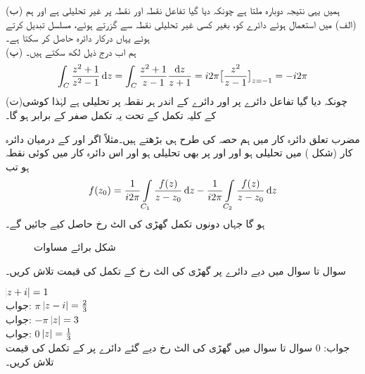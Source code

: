 (ب) \quad ہمیں یہی نتیجہ دوبارہ ملتا ہے چونکہ دیا گیا تفاعل نقطہ  اور نقطہ  پر غیر تحلیلی ہے اور ہم (الف) میں استعمال ہوئے دائرے کو، بغیر کسی غیر تحلیلی نقطہ سے گزرتے ہوئے، مسلسل تبدیل کرتے ہوئے یہاں درکار دائرہ حاصل کر سکتا ہے۔\\
(پ) \quad ہم اب درج ذیل لکھ سکتے ہیں۔
\begin{align*}
\int_C \frac{z^2+1}{z^2-1}\dif z=\int_C \frac{z^2+1}{z-1}\frac{\dif z}{z+1}=i2\pi\big[\frac{z^2}{z-1}\big]_{z=-1}=-i2\pi
\end{align*}
(ت)\quad چونکہ دیا گیا تفاعل دائرے پر اور دائرے کے اندر ہر نقطہ پر تحلیلی ہے لہٰذا کوشی کے کلیہ تکمل کے تحت یہ تکمل صفر کے برابر ہو گا۔ 


مضرب تعلق دائرہ کار میں ہم حصہ  کی طرح ہی بڑھتے ہیں۔مثلاً اگر  اور   کے درمیان دائرہ کار (شکل ) میں  تحلیلی ہو اور  اور  پر بھی  تحلیلی ہو اور اس دائرہ کار میں  کوئی نقطہ ہو تب
\begin{align}\label{مساوات_مخلوط_تکمل_کوشی_کلیہ_تکمل_پ}
f(z_0)=\frac{1}{i2\pi}\int\limits_{C_1}\frac{f(z)}{z-z_0}\dif z-\frac{1}{i2\pi}\int\limits_{C_2} \frac{f(z)}{z-z_0}\dif z
\end{align}
ہو گا جہاں دونوں تکمل گھڑی کی الٹ رخ حاصل کیے جائیں گے۔
\begin{figure}
\centering
{}
\caption{شکل برائے مساوات }
\label{شکل_مساوات_مخلوط_تکمل_کوشی_کلیہ_تکمل_پ}
\end{figure}

سوال  تا سوال  میں دیے دائرے پر گھڑی کی الٹ رخ  کے تکمل کی قیمت تلاش کریں۔

\quad
$\abs{z+i}=1$\\
جواب:\quad
$\pi$
\quad
$\abs{z-i}=\tfrac{2}{3}$\\
جواب:\quad
$-\pi$
\quad
$\abs{z}=3$\\
جواب:\quad
$0$
\quad
$\abs{z}=\tfrac{1}{3}$\\
جواب:\quad
$0$
سوال  تا سوال  میں گھڑی کی الٹ رخ دیے گئے  دائرے پر  کے تکمل کی قیمت تلاش کریں۔ 

